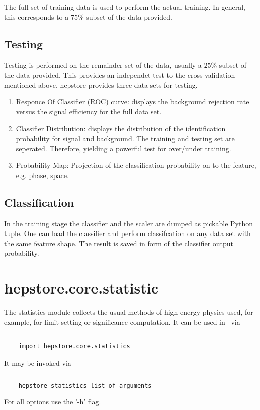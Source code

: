 The full set of training data is used to perform the actual
training. In general, this corresponds to a $75\%$ subset of the data
provided.

\subsection{Testing}

Testing is performed on the remainder set of the data, usually a
$25\%$ subset of the data provided. This provides an independet test
to the cross validation mentioned above. hepstore provides three data
sets for testing.
%
\begin{enumerate}
\item Responce Of Classifier (ROC) curve: displays the background
  rejection rate versus the signal efficiency for the full data set.
\item Classifier Distribution: displays the distribution of the
  identification probability for signal and background. The training
  and testing set are seperated. Therefore, yielding a powerful test
  for over/under training.
\item Probability Map: Projection of the classification probability on
  to the feature, e.g. phase, space.
\end{enumerate}
%

\subsection{Classification}

In the training stage the classifier and the scaler are dumped as
pickable Python tuple. One can load the classifier and perform
classifcation on any data set with the same feature shape. The result
is saved in form of the classifier output probability.

\section{hepstore.core.statistic}

The statistics module collects the usual methods of high energy
physics used, for example, for limit setting or significance
computation. It can be used in \python~via
%
\begin{changemargin}{1.5cm}{1.5cm}
  \centering
  \begin{lstlisting}
    
    import hepstore.core.statistics
  \end{lstlisting}
\end{changemargin}
%
It may be invoked via
%
\begin{changemargin}{1.5cm}{1.5cm}
  \centering
  \begin{lstlisting}[language=Bash]
    
    hepstore-statistics list_of_arguments
  \end{lstlisting}
\end{changemargin}
%
For all options use the '-h' flag.

